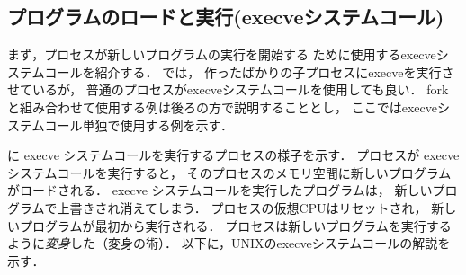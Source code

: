 
\subsection{プログラムのロードと実行(execveシステムコール)}
まず，プロセスが新しいプログラムの実行を開始する
ために使用するexecveシステムコールを紹介する．
では，
作ったばかりの子プロセスにexecveを実行させているが，
普通のプロセスがexecveシステムコールを使用しても良い．
forkと組み合わせて使用する例は後ろの方で説明することとし，
ここではexecveシステムコール単独で使用する例を示す．

に execve システムコールを実行するプロセスの様子を示す．
プロセスが execve システムコールを実行すると，
そのプロセスのメモリ空間に新しいプログラムがロードされる．
execve システムコールを実行したプログラムは，
新しいプログラムで上書きされ消えてしまう．
プロセスの仮想CPUはリセットされ，
新しいプログラムが最初から実行される．
プロセスは新しいプログラムを実行するように\emph{変身}した（変身の術）．
以下に，UNIXのexecveシステムコールの解説を示す．


